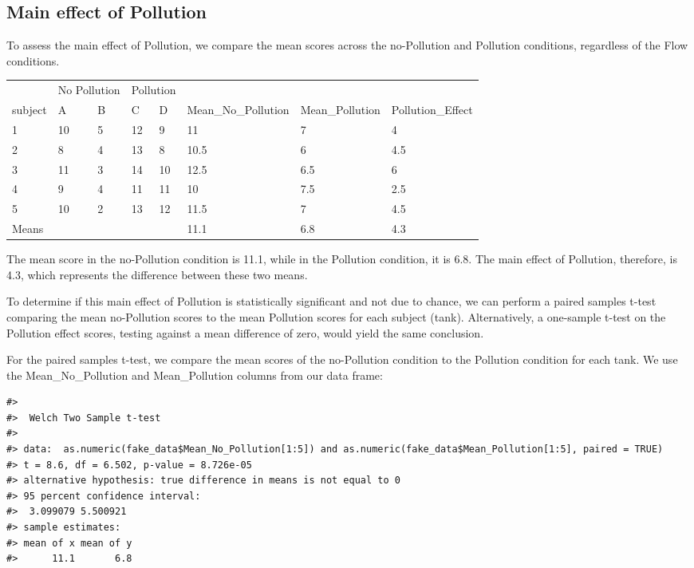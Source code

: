 \documentclass[
  letterpaper,
  DIV=11,
  numbers=noendperiod]{scrreprt}
\begin{document}
\subsection{Main effect of Pollution}\label{main-effect-of-pollution}

To assess the main effect of Pollution, we compare the mean scores
across the no-Pollution and Pollution conditions, regardless of the Flow
conditions.

\begin{table}
\centering
\begin{tabular}{l|l|l|l|l|l|l|l}
\hline
\multicolumn{1}{c|}{ } & \multicolumn{2}{c|}{No Pollution} & \multicolumn{2}{c|}{Pollution} & \multicolumn{3}{c}{ } \\
\cline{2-3} \cline{4-5}
subject & A & B & C & D & Mean\_No\_Pollution & Mean\_Pollution & Pollution\_Effect\\
\hline
1 & 10 & 5 & 12 & 9 & 11 & 7 & 4\\
\hline
2 & 8 & 4 & 13 & 8 & 10.5 & 6 & 4.5\\
\hline
3 & 11 & 3 & 14 & 10 & 12.5 & 6.5 & 6\\
\hline
4 & 9 & 4 & 11 & 11 & 10 & 7.5 & 2.5\\
\hline
5 & 10 & 2 & 13 & 12 & 11.5 & 7 & 4.5\\
\hline
Means &  &  &  &  & 11.1 & 6.8 & 4.3\\
\hline
\end{tabular}
\end{table}

The mean score in the no-Pollution condition is 11.1, while in the
Pollution condition, it is 6.8. The main effect of Pollution, therefore,
is 4.3, which represents the difference between these two means.

To determine if this main effect of Pollution is statistically
significant and not due to chance, we can perform a paired samples
t-test comparing the mean no-Pollution scores to the mean Pollution
scores for each subject (tank). Alternatively, a one-sample t-test on
the Pollution effect scores, testing against a mean difference of zero,
would yield the same conclusion.

For the paired samples t-test, we compare the mean scores of the
no-Pollution condition to the Pollution condition for each tank. We use
the Mean\_No\_Pollution and Mean\_Pollution columns from our data frame:

\begin{verbatim}
#> 
#>  Welch Two Sample t-test
#> 
#> data:  as.numeric(fake_data$Mean_No_Pollution[1:5]) and as.numeric(fake_data$Mean_Pollution[1:5], paired = TRUE)
#> t = 8.6, df = 6.502, p-value = 8.726e-05
#> alternative hypothesis: true difference in means is not equal to 0
#> 95 percent confidence interval:
#>  3.099079 5.500921
#> sample estimates:
#> mean of x mean of y 
#>      11.1       6.8
\end{verbatim}
\end{document}

